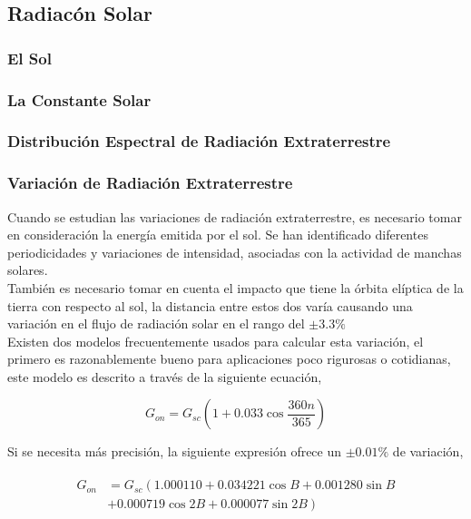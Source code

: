 \subsection{Radiacón Solar}

\subsubsection{El Sol}

\subsubsection{La Constante Solar}

\subsubsection{Distribución Espectral de Radiación Extraterrestre}

\subsubsection{Variación de Radiación Extraterrestre}
Cuando se estudian las variaciones de radiación extraterrestre, es necesario tomar en consideración la energía emitida por el sol. Se han identificado diferentes periodicidades y variaciones de intensidad, asociadas con la actividad de manchas solares. \\

También es necesario tomar en cuenta el impacto que tiene la órbita elíptica de la tierra con respecto al sol, la distancia entre estos dos varía causando una variación en el flujo de radiación solar en el rango del $\pm3.3\%$ \\

Existen dos modelos frecuentemente usados para calcular esta variación, el primero es razonablemente bueno para aplicaciones poco rigurosas o cotidianas, este modelo es descrito a través de la siguiente ecuación,

\begin{equation}
		G_{on} = G_{sc}\left(1 + 0.033 \cos \frac{360n}{365}\right) 
\end{equation}

Si se necesita más precisión, la siguiente expresión ofrece un $\pm0.01\%$ de variación,

\begin{align}
	\begin{aligned} \label{eq:variacion_extraterrestre_precisa}
		G_{on} & = G_{sc} \left(1.000110 + 0.034221 \cos B + 0.001280 \sin B \right.	\\
		& \left. + 0.000719 \cos 2B + 0.000077 \sin 2B \right)
	\end{aligned}
\end{align}

